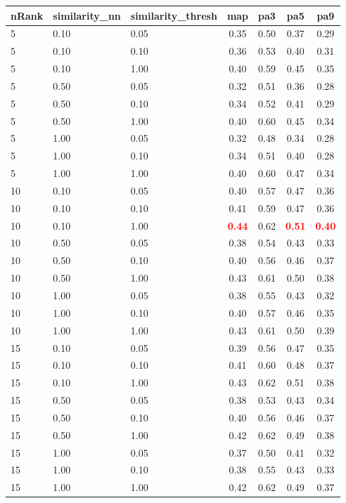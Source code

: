 \begin{tabular}{lllcccc} 
nRank & similarity\_nn & similarity\_thresh & map & pa3 & pa5 & pa9 \\ 
\hline 
 5 & 0.10 & 0.05 & 0.35 & 0.50 & 0.37 & 0.29 \\ 
 5 & 0.10 & 0.10 & 0.36 & 0.53 & 0.40 & 0.31 \\ 
 5 & 0.10 & 1.00 & 0.40 & 0.59 & 0.45 & 0.35 \\ 
 5 & 0.50 & 0.05 & 0.32 & 0.51 & 0.36 & 0.28 \\ 
 5 & 0.50 & 0.10 & 0.34 & 0.52 & 0.41 & 0.29 \\ 
 5 & 0.50 & 1.00 & 0.40 & 0.60 & 0.45 & 0.34 \\ 
 5 & 1.00 & 0.05 & 0.32 & 0.48 & 0.34 & 0.28 \\ 
 5 & 1.00 & 0.10 & 0.34 & 0.51 & 0.40 & 0.28 \\ 
 5 & 1.00 & 1.00 & 0.40 & 0.60 & 0.47 & 0.34 \\ 
10 & 0.10 & 0.05 & 0.40 & 0.57 & 0.47 & 0.36 \\ 
10 & 0.10 & 0.10 & 0.41 & 0.59 & 0.47 & 0.36 \\ 
10 & 0.10 & 1.00 & \textbf{\textcolor{red}{0.44}} & 0.62 & \textbf{\textcolor{red}{0.51}} & \textbf{\textcolor{red}{0.40}} \\ 
10 & 0.50 & 0.05 & 0.38 & 0.54 & 0.43 & 0.33 \\ 
10 & 0.50 & 0.10 & 0.40 & 0.56 & 0.46 & 0.37 \\ 
10 & 0.50 & 1.00 & 0.43 & 0.61 & 0.50 & 0.38 \\ 
10 & 1.00 & 0.05 & 0.38 & 0.55 & 0.43 & 0.32 \\ 
10 & 1.00 & 0.10 & 0.40 & 0.57 & 0.46 & 0.35 \\ 
10 & 1.00 & 1.00 & 0.43 & 0.61 & 0.50 & 0.39 \\ 
15 & 0.10 & 0.05 & 0.39 & 0.56 & 0.47 & 0.35 \\ 
15 & 0.10 & 0.10 & 0.41 & 0.60 & 0.48 & 0.37 \\ 
15 & 0.10 & 1.00 & 0.43 & 0.62 & 0.51 & 0.38 \\ 
15 & 0.50 & 0.05 & 0.38 & 0.53 & 0.43 & 0.34 \\ 
15 & 0.50 & 0.10 & 0.40 & 0.56 & 0.46 & 0.37 \\ 
15 & 0.50 & 1.00 & 0.42 & 0.62 & 0.49 & 0.38 \\ 
15 & 1.00 & 0.05 & 0.37 & 0.50 & 0.41 & 0.32 \\ 
15 & 1.00 & 0.10 & 0.38 & 0.55 & 0.43 & 0.33 \\ 
15 & 1.00 & 1.00 & 0.42 & 0.62 & 0.49 & 0.37 \\ 

\end{tabular}
